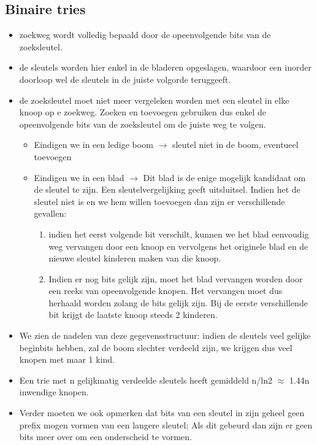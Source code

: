 \subsection{Binaire tries}
\begin{itemize}
\item zoekweg wordt volledig bepaald door de opeenvolgende bits van de zoeksleutel.
\item de sleutels worden hier enkel in de bladeren opgeslagen, waardoor een inorder doorloop wel de sleutels in de juiste volgorde teruggeeft.
\clearpage
\item de zoeksleutel moet niet meer vergeleken worden met een sleutel in elke knoop op e zoekweg. Zoeken en toevoegen gebruiken dus enkel de opeenvolgende bits van de zoeksleutel om de juiste weg te volgen.
\begin{itemize}
\item Eindigen we in een ledige boom $\rightarrow$ sleutel niet in de boom, eventueel toevoegen
\item Eindigen we in een blad $\rightarrow$ Dit blad is de enige mogelijk kandidaat om de sleutel te zijn. Een sleutelvergelijking geeft uitsluitsel. Indien het de sleutel niet is en we hem willen toevoegen dan zijn er verschillende gevallen:
\begin{enumerate}
\item indien het eerst volgende bit verschilt, kunnen we het blad eenvoudig weg vervangen door een knoop en vervolgens het originele blad en de nieuwe sleutel kinderen maken van die knoop.
\item Indien er nog bits gelijk zijn, moet het blad vervangen worden door een reeks van opeenvolgende knopen. Het vervangen moet dus herhaald worden zolang de bits gelijk zijn. Bij de eerste verschillende bit krijgt de laatste knoop steeds 2 kinderen.
\end{enumerate}
\end{itemize}
\item We zien de nadelen van deze gegevensstructuur: indien de sleutels veel gelijke beginbits hebben, zal de boom slechter verdeeld zijn, we krijgen dus veel knopen met maar 1 kind. 
\item Een trie met n gelijkmatig verdeelde sleutels heeft gemiddeld n/ln2 $\approx$ 1.44n inwendige knopen.
\item Verder moeten we ook opmerken dat bits van een sleutel in zijn geheel geen prefix mogen vormen van een langere sleutel; Als dit gebeurd dan zijn er geen bits meer over om een onderscheid te vormen.

\end{itemize}
